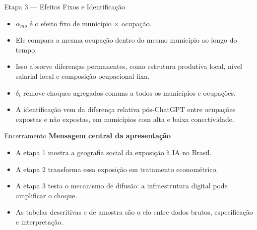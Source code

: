 \documentclass[
  ignorenonframetext,
  aspectratio=169,
]{beamer}
\providecommand{\tightlist}{%
  \setlength{\itemsep}{0pt}\setlength{\parskip}{0pt}}
\begin{document}
\begin{frame}{Etapa 3 --- Efeitos Fixos e Identificação}
\label{etapa-3-efeitos-fixos-e-identificauxe7uxe3o}
\begin{itemize}
\tightlist
\item
  \(\alpha_{mo}\) é o efeito fixo de município × ocupação.
\item
  Ele compara a mesma ocupação dentro do mesmo município ao longo do
  tempo.
\item
  Isso absorve diferenças permanentes, como estrutura produtiva local,
  nível salarial local e composição ocupacional fixa.
\item
  \(\delta_t\) remove choques agregados comuns a todos os municípios e
  ocupações.
\item
  A identificação vem da diferença relativa pós-ChatGPT entre ocupações
  expostas e não expostas, em municípios com alta e baixa conectividade.
\end{itemize}
\end{frame}

\begin{frame}{Encerramento}
\label{encerramento}
\textbf{Mensagem central da apresentação}

\begin{itemize}
\tightlist
\item
  A etapa 1 mostra a geografia social da exposição à IA no Brasil.
\item
  A etapa 2 transforma essa exposição em tratamento econométrico.
\item
  A etapa 3 testa o mecanismo de difusão: a infraestrutura digital pode
  amplificar o choque.
\item
  As tabelas descritivas e de amostra são o elo entre dados brutos,
  especificação e interpretação.
\end{itemize}
\end{frame}
\end{document}
